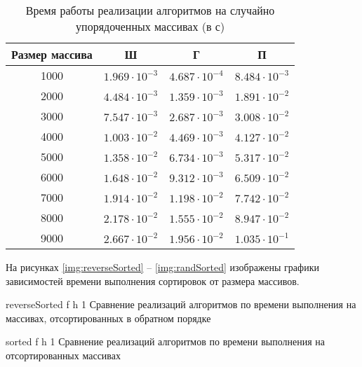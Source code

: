 \begin{table}[h]
	\begin{center}
		\begin{threeparttable}
			\captionsetup{justification=raggedright,singlelinecheck=off}
			\caption{Время работы реализации алгоритмов на случайно упорядоченных массивах (в с)}
			\label{tbl:time_measurements_rand}
			\begin{tabular}{|c|c|c|c|}
				\hline
				Размер массива &  Ш  & Г & П \\
				\hline
				1000 &$ 1.969\cdot 10^{-3} $&$ 4.687\cdot 10^{-4} $&$ 8.484\cdot 10^{-3}$\\
				\hline
				2000 &$ 4.484\cdot 10^{-3} $&$ 1.359\cdot 10^{-3} $&$ 1.891\cdot 10^{-2}$\\
				\hline
				3000 &$ 7.547\cdot 10^{-3} $&$ 2.687\cdot 10^{-3} $&$ 3.008\cdot 10^{-2}$\\
				\hline
				4000 &$ 1.003\cdot 10^{-2} $&$ 4.469\cdot 10^{-3} $&$ 4.127\cdot 10^{-2}$\\
				\hline
				5000 &$ 1.358\cdot 10^{-2} $&$ 6.734\cdot 10^{-3} $&$ 5.317\cdot 10^{-2}$\\
				\hline
				6000 &$ 1.648\cdot 10^{-2} $&$ 9.312\cdot 10^{-3} $&$ 6.509\cdot 10^{-2}$\\
				\hline
				7000 &$ 1.914\cdot 10^{-2} $&$ 1.198\cdot 10^{-2} $&$ 7.742\cdot 10^{-2}$\\
				\hline
				8000 &$ 2.178\cdot 10^{-2} $&$ 1.555\cdot 10^{-2} $&$ 8.947\cdot 10^{-2}$\\
				\hline
				9000 &$ 2.667\cdot 10^{-2} $&$ 1.956\cdot 10^{-2} $&$ 1.035\cdot 10^{-1}$\\
				\hline
			\end{tabular}
		\end{threeparttable}
	\end{center}
\end{table}

\clearpage
На рисунках \ref{img:reverseSorted} -- \ref{img:randSorted} изображены графики зависимостей времени выполнения сортировок от размера массивов.

{reverseSorted} %
{f} %
{h} %
{1\textwidth} %
{Сравнение реализаций алгоритмов по времени выполнения на массивах, отсортированных в обратном порядке} %

{sorted} %
{f} %
{h} %
{1\textwidth} %
{Сравнение реализаций алгоритмов по времени выполнения на отсортированных массивах} %

